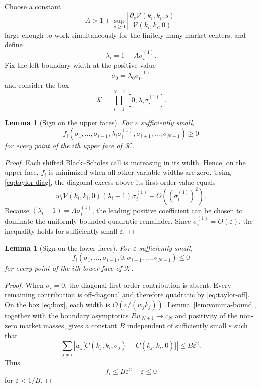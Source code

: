 \documentclass[11pt]{article}
\newtheorem{lemma}[theorem]{Lemma}
\newcommand{\eps}{\varepsilon}
\newcommand{\Vega}{\mathcal{V}}
\begin{document}
Choose a constant
\[
A>1+\sup_{s\ge0}\left|\frac{\partial_s\Vega(k_i,k_i,s)}{\Vega(k_i,k_i,0)}\right|
\]
large enough to work simultaneously for the finitely many market centers, and define
\[
\lambda_i=1+A\sigma_i^{(1)}.
\]
Fix the left-boundary width at the positive value
\[
\sigma_0=\lambda_0\sigma_0^{(1)}
\]
and consider the box
\begin{equation}
\mathcal K=\prod_{i=1}^{N+1}[0,\lambda_i\sigma_i^{(1)}].
\label{eq:box}
\end{equation}

\begin{lemma}[Sign on the upper faces]\label{lem:upperface}
For $\eps$ sufficiently small,
\[
f_i(\sigma_1,\ldots,\sigma_{i-1},\lambda_i\sigma_i^{(1)},\sigma_{i+1},\ldots,\sigma_{N+1})\ge0
\]
for every point of the $i$th upper face of $\mathcal K$.
\end{lemma}

\begin{proof}
Each shifted Black--Scholes call is increasing in its width. Hence, on the upper face, $f_i$ is minimized when all other variable widths are zero. Using \eqref{eq:taylor-diag}, the diagonal excess above its first-order value equals
\[
w_i\Vega(k_i,k_i,0)(\lambda_i-1)\sigma_i^{(1)}
+O((\sigma_i^{(1)})^2).
\]
Because $(\lambda_i-1)=A\sigma_i^{(1)}$, the leading positive coefficient can be chosen to dominate the uniformly bounded quadratic remainder. Since $\sigma_i^{(1)}=O(\eps)$, the inequality holds for sufficiently small $\eps$.
\end{proof}

\begin{lemma}[Sign on the lower faces]\label{lem:lowerface}
For $\eps$ sufficiently small,
\[
f_i(\sigma_1,\ldots,\sigma_{i-1},0,\sigma_{i+1},\ldots,\sigma_{N+1})\le0
\]
for every point of the $i$th lower face of $\mathcal K$.
\end{lemma}

\begin{proof}
When $\sigma_i=0$, the diagonal first-order contribution is absent. Every remaining contribution is off-diagonal and therefore quadratic by \eqref{eq:taylor-off}. On the box \eqref{eq:box}, each width is $O(\eps/(w_jk_j))$. Lemma~\ref{lem:vomma-bound}, together with the boundary asymptotics $R w_{N+1}\to c_N$ and positivity of the non-zero market masses, gives a constant $B$ independent of sufficiently small $\eps$ such that
\[
\sum_{j\ne i}
\left|w_j\bigl[C(k_j,k_i,\sigma_j)-C(k_j,k_i,0)\bigr]\right|
\le B\eps^2.
\]
Thus
\[
f_i\le B\eps^2-\eps\le0
\]
for $\eps<1/B$.
\end{proof}
\end{document}
